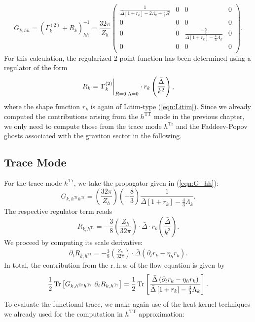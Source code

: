 \begin{equation} G_{k, h h}=\left(\Gamma^{(2)}_k+R_{k}\right)_{h h}^{-1} = \frac{32\pi}{Z_h}
\begin{pmatrix}
\frac{1}{\bar{\Delta}\left[1+r_{k}\right]-2\Lambda_k+\frac{2}{3}\mathcal{R}} & 0 & 0 & 0 \\[10pt]
0 & 0  & 0 & 0 \\[10pt]
0 & 0 & \frac{-\frac{8}{3}}{\bar{\Delta}\left[1+r_{k}\right]-\frac{4}{3} \Lambda_k}  &0\\[10pt]
0 & 0 & 0 & 0 \\
\end{pmatrix}.
\label{eqn:G_hh}
\end{equation}
For this calculation, the regularized 2-point-function has been determined using a regulator of the form
\begin{equation}
R_{k}=\eval{\Gamma_{k}^{(2)}}_{\bar{R}=0, \Lambda=0} \cdot r_{k}\left(\frac{\bar{\Delta}}{k^2}\right),
\end{equation}
where the shape function $r_k$ is again of Litim-type (\ref{eqn:Litim}). Since we already computed the contributions arising from the $h^{\mathrm{TT}}$ mode in the previous chapter, we only need to compute those from the trace mode $h^{\mathrm{Tr}}$ and the Faddeev-Popov ghosts associated with the graviton sector in the following. 
\vspace{-0.5cm}
\subsection{Trace Mode}
For the trace mode $h^{\mathrm{Tr}}$, we take the propagator given in (\ref{eqn:G_hh}):
\begin{equation}
	G_{k, h^{\mathrm{Tr}}h^{\mathrm{Tr}}} =\left(\frac{32\pi}{Z_h}\right) \left(-\frac{8}{3}\right)\frac{1}{\bar{\Delta}\left[1+r_k\right] - \frac{4}{3}\Lambda_k}.
\end{equation}
The respective regulator term reads
\begin{equation}
	R_{k,h^{\mathrm{Tr}}} = -\frac{3}{8}\left(\frac{Z_h}{32\pi}\right)\cdot\bar{\Delta}\cdot r_k\left(\frac{\bar{\Delta}}{k^2}\right).
\end{equation}
We proceed by computing its scale derivative:
\begin{align}
	\partial_t R_{k,h^{\mathrm{Tr}}} = -\frac{3}{8}\left(\frac{Z_h}{32\pi}\right)\cdot\bar{\Delta}\left(\partial_tr_k - \eta_h r_k\right).
\end{align}
In total, the contribution from the r.\,h.\,s. of the flow equation is given by 
\begin{equation}
	\begin{aligned}
	\frac{1}{2}\operatorname{Tr}\left[ G_{k, h^{\mathrm{Tr}}h^{\mathrm{Tr}}}\ \partial_t R_{k, h^{\mathrm{Tr}}} \right] =
		\frac{1}{2}\operatorname{Tr}\left[ \frac{\bar{\Delta}\left(\partial_tr_k - \eta_h r_k\right)}{\bar{\Delta}\left[1+r_k\right] - \frac{4}{3}\Lambda_k} \right].
	\end{aligned}
\end{equation}
To evaluate the functional trace, we make again use of the heat-kernel techniques we already used for the computation in $h^{\mathrm{TT}}$ approximation:

